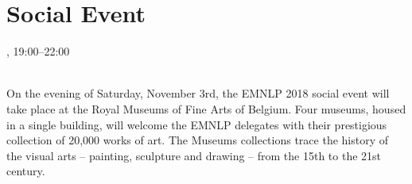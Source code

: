 \section{Social Event}
\setheaders{}{\daydateyear}

\begin{center}



\daydateyear, 19:00--22:00\vspace{1em}\\
\SocialEventLoc\\
\end{center}
On the evening of Saturday, November 3rd, the EMNLP 2018 social event will take place at the Royal Museums of Fine Arts of Belgium. Four museums, housed in a single building, will welcome the EMNLP delegates with their prestigious collection of 20,000 works of art. The Museums collections trace the history of the visual arts -- painting, sculpture and drawing -- from the 15th to the 21st century.
